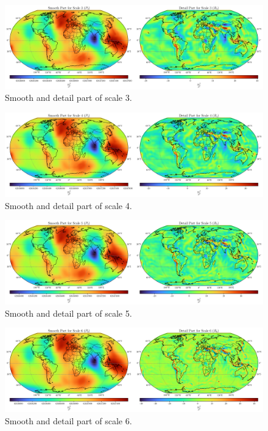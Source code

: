 \documentclass[12pt]{article}
\begin{document}
	\begin{figure}[h!]
		\centering
		\includegraphics[width=16cm]{../Outputs/Plots/Outputs_Scale3.pdf}
		\caption{Smooth and detail part of scale 3.}
		\label{fig:Results3}
	\end{figure}
	
	\begin{figure}[h!]
		\centering
		\includegraphics[width=16cm]{../Outputs/Plots/Outputs_Scale4.pdf}
		\caption{Smooth and detail part of scale 4.}
		\label{fig:Results4}
	\end{figure}
	
	\begin{figure}[h!]
		\centering
		\includegraphics[width=16cm]{../Outputs/Plots/Outputs_Scale5.pdf}
		\caption{Smooth and detail part of scale 5.}
		\label{fig:Results5}
	\end{figure}
	
		\begin{figure}[h!]
		\centering
		\includegraphics[width=16cm]{../Outputs/Plots/Outputs_Scale6.pdf}
		\caption{Smooth and detail part of scale 6.}
		\label{fig:Results6}
	\end{figure}
	
\end{document}
